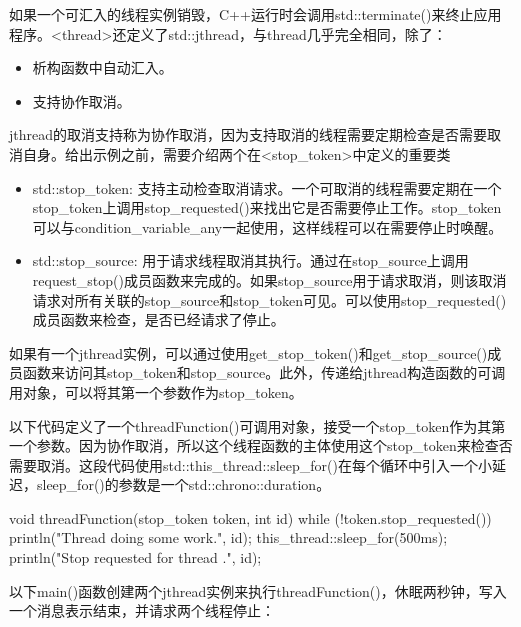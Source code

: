 
如果一个可汇入的线程实例销毁，C++运行时会调用std::terminate()来终止应用程序。<thread>还定义了std::jthread，与thread几乎完全相同，除了：

\begin{itemize}
\item
析构函数中自动汇入。

\item
支持协作取消。
\end{itemize}


jthread的取消支持称为协作取消，因为支持取消的线程需要定期检查是否需要取消自身。给出示例之前，需要介绍两个在<stop\_token>中定义的重要类

\begin{itemize}
\item
std::stop\_token: 支持主动检查取消请求。一个可取消的线程需要定期在一个stop\_token上调用stop\_requested()来找出它是否需要停止工作。stop\_token可以与condition\_variable\_any一起使用，这样线程可以在需要停止时唤醒。

\item
std::stop\_source: 用于请求线程取消其执行。通过在stop\_source上调用request\_stop()成员函数来完成的。如果stop\_source用于请求取消，则该取消请求对所有关联的stop\_source和stop\_token可见。可以使用stop\_requested()成员函数来检查，是否已经请求了停止。
\end{itemize}

如果有一个jthread实例，可以通过使用get\_stop\_token()和get\_stop\_source()成员函数来访问其stop\_token和stop\_source。此外，传递给jthread构造函数的可调用对象，可以将其第一个参数作为stop\_token。

以下代码定义了一个threadFunction()可调用对象，接受一个stop\_token作为其第一个参数。因为协作取消，所以这个线程函数的主体使用这个stop\_token来检查否需要取消。这段代码使用std::this\_thread::sleep\_for()在每个循环中引入一个小延迟，sleep\_for()的参数是一个std::chrono::duration。

\begin{cpp}
void threadFunction(stop_token token, int id)
{
    while (!token.stop_requested()) {
        println("Thread {} doing some work.", id);
        this_thread::sleep_for(500ms);
    }
    println("Stop requested for thread {}.", id);
}
\end{cpp}

以下main()函数创建两个jthread实例来执行threadFunction()，休眠两秒钟，写入一个消息表示结束，并请求两个线程停止：

